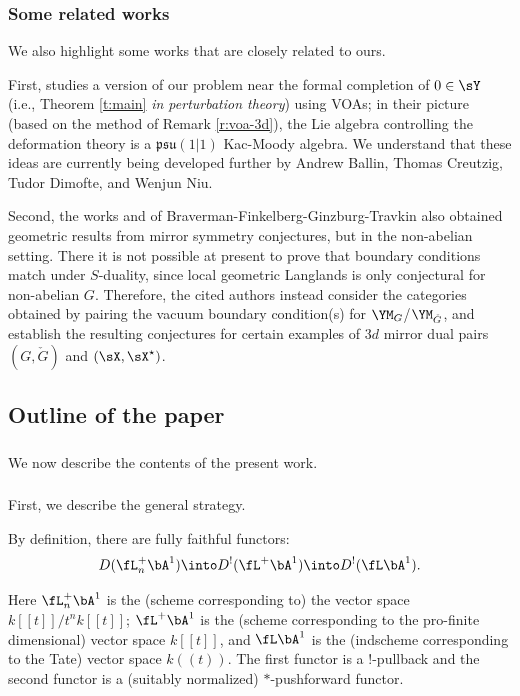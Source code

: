\subsubsection{Some related works}

We also highlight some works that are closely related to ours.

First, \cite{ccg} studies a version of our problem
near the formal completion of $0 \in \sY$ (i.e., Theorem \ref{t:main}
\emph{in perturbation theory}) using VOAs; in their picture (based on the
method of Remark \ref{r:voa-3d}), the
Lie algebra controlling the deformation theory is a
$\mathfrak{psu}(1|1)$ Kac-Moody algebra. We understand that these ideas
are currently being developed further by Andrew Ballin, Thomas Creutzig,
Tudor Dimofte, and Wenjun Niu.

Second, the works \cite{bfgt} and \cite{bft}
of Braverman-Finkelberg-Ginzburg-Travkin also obtained geometric results from
mirror symmetry conjectures, but in the non-abelian setting.
There it is not possible at present
to prove that boundary conditions match under $S$-duality, since
local geometric Langlands is only conjectural for non-abelian $G$.
Therefore, the cited authors instead consider the categories obtained by
pairing the vacuum boundary condition(s) for
$\YM_G$/$\YM_{\check{G}}$, and
establish the resulting conjectures for certain examples of
$3d$ mirror dual pairs $(G,\check{G})$ and $(\sX,\sX^{\star})$.

\subsection{Outline of the paper}

\subsubsection{} We now describe the contents of the present work.

\subsubsection{}\label{ss:intro-strategy}

First, we describe the general strategy.

By definition, there are fully faithful functors:
%
\[
D(\fL_n^+\bA^1) \into D^!(\fL^+ \bA^1) \into D^!(\fL \bA^1).
\]

 Here $\fL_n^+\bA^1$ is the (scheme corresponding to)
the vector space $k[[t]]/t^nk[[t]]$; $\fL^+ \bA^1$ is the
(scheme corresponding to the pro-finite dimensional) vector
space $k[[t]]$, and $\fL\bA^1$ is the (indscheme corresponding to
the Tate) vector space $k((t))$. The first functor is a $!$-pullback
and the second functor is a (suitably normalized) $*$-pushforward functor.

